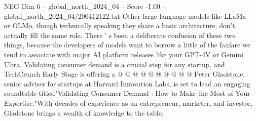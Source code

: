 \begin{textsample}{NEG Dim 6 – global\_north\_2024\_04 – Score -1.00 – global\_north\_2024\_04/200412122.txt}
Other large language models like LLaMa or OLMo, though technically speaking they share a basic architecture, don't actually fill the same role.
There ' s been a deliberate confusion of these two things, because the developers of models want to borrow a little of the fanfare we tend to associate with major AI platform releases like your GPT-4V or Gemini Ultra.
Validating consumer demand is a crucial step for any startup, and TechCrunch Early Stage is offering a @ @ @ @ @ @ @ @ @ @ Peter Gladstone, senior adviser for startups at Harvard Innovation Labs, is set to lead an engaging roundtable titled"Validating Consumer Demand : How to Make the Most of Your Expertise."With decades of experience as an entrepreneur, marketer, and investor, Gladstone brings a wealth of knowledge to the table.

\end{textsample}
